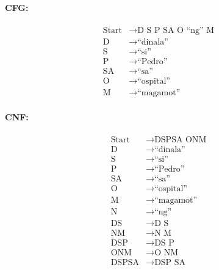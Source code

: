 \paragraph{CFG:}
\begin{equation*}
    \begin{aligned}
        \text{Start}   & \rightarrow \text{D S P SA O “ng” M}   \\
        \text{D} & \rightarrow \text{“dinala”} \\
        \text{S} & \rightarrow \text{“si”} \\
        \text{P} & \rightarrow \text{“Pedro”} \\
        \text{SA} & \rightarrow \text{“sa”} \\
        \text{O} & \rightarrow \text{“ospital”} \\
        \text{M} & \rightarrow \text{“magamot”}
    \end{aligned}
\end{equation*}

\paragraph{CNF:}
\begin{equation*}
    \begin{aligned}
        \text{Start}   & \rightarrow \text{DSPSA ONM}   \\
        \text{D} & \rightarrow \text{“dinala”} \\
        \text{S} & \rightarrow \text{“si”} \\
        \text{P} & \rightarrow \text{“Pedro”} \\
        \text{SA} & \rightarrow \text{“sa”} \\
        \text{O} & \rightarrow \text{“ospital”} \\
        \text{M} & \rightarrow \text{“magamot”} \\
        \text{N} & \rightarrow \text{“ng”} \\
        \text{DS} & \rightarrow \text{D S} \\
        \text{NM} & \rightarrow \text{N M} \\
        \text{DSP} & \rightarrow \text{DS P} \\
        \text{ONM} & \rightarrow \text{O NM} \\
        \text{DSPSA} & \rightarrow \text{DSP SA}
    \end{aligned}
\end{equation*}

